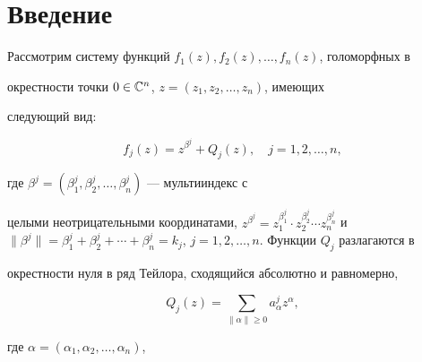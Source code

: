 \date{}




\pagestyle{plain} %







\maketitle


\label{begin}








\section*{Введение}





Рассмотрим систему функций $f_1(z), f_2(z),\dotsc, f_n(z)$, голоморфных в


окрестности точки $0\in\Bbb C^n$, $z=(z_1,z_2,\dotsc, z_n)$, имеющих


следующий вид:


\begin{equation}\label{f1}


f_j(z)=z^{\beta^j}+Q_j(z),\quad j=1,2,\ldots, n,


\end{equation}


где $\beta^j =(\beta_1^j,\beta_2^j,\dotsc,\beta_n^j)$ --- мультииндекс с


целыми неотрицательными координатами, $z^{\beta^j}=z_1^{\beta_1^j}\cdot


z_2^{\beta_2^j}\dotsb z_n^{\beta_n^j}$ и $\|\beta^j\|=\beta_1^j+\beta_2^j+


\dotsb +\beta_n^j=k_j$, $j=1,2,\dotsc, n$. Функции $Q_j$ разлагаются в


окрестности нуля в ряд Тейлора, сходящийся  абсолютно и равномерно,


\begin{equation}\label{f2}


Q_j(z)=\sum_{\|\alpha\|\geqslant 0}a_\alpha^j z^\alpha,


\end{equation}


где $\alpha=(\alpha_1,\alpha_2,\dotsc,\alpha_n)$,


